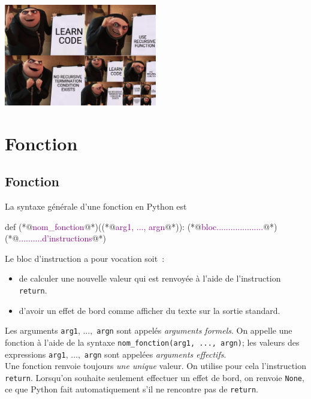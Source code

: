 \documentclass{magnolia}
\begin{document}
\hfill\includegraphics[width=0.5\textwidth]{../../Commun/Images/python-cours-recursion}
\magtoc

\section{Fonction}

\subsection{Fonction}

La syntaxe générale d'une fonction en Python est
\begin{pythoncode}
def (*@\textcolor{purple}{nom\_fonction}@*)((*@\textcolor{purple}{arg1, ..., argn}@*)):
    (*@\textcolor{purple}{bloc....................}@*)
    (*@\textcolor{purple}{..........d'instructions}@*)
\end{pythoncode}

\noindent
Le bloc d'instruction a pour vocation soit~:
\begin{itemize}
\item de calculer une nouvelle valeur qui est renvoyée à l'aide
de l'instruction \verb_return_.
\item d'avoir un effet de bord comme afficher du texte
sur la sortie standard.
\end{itemize}
Les arguments \verb_arg1_, $\ldots,$ \verb_argn_ sont appelés
\emph{arguments formels}. On appelle une fonction à l'aide de la syntaxe
\verb!nom_fonction(arg1, ..., argn)!; les valeurs des expressions
\verb_arg1_, $\ldots,$ \verb_argn_ sont appelées \emph{arguments effectifs}.\\

Une fonction
renvoie toujours \emph{une unique} valeur. On utilise pour cela l'instruction \verb!return!. Lorsqu'on souhaite seulement effectuer un effet de bord, on renvoie \verb!None!, ce que
Python fait automatiquement s'il ne rencontre pas de \verb!return!.\\
\end{document}

